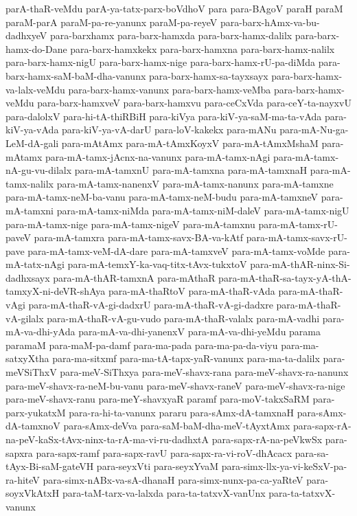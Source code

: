 {parA-thaR-veMdu
parA-ya-tatx-parx-boVdhoV
para
para-BAgoV
paraH
paraM
paraM-parA
paraM-pa-re-yanunx
paraM-pa-reyeV
para-barx-hAmx-va-bu-dadhxyeV
para-barxhamx
para-barx-hamxda
para-barx-hamx-dalilx
para-barx-hamx-do-Dane
para-barx-hamxkekx
para-barx-hamxna
para-barx-hamx-nalilx
para-barx-hamx-nigU
para-barx-hamx-nige
para-barx-hamx-rU-pa-diMda
para-barx-hamx-saM-baM-dha-vanunx
para-barx-hamx-sa-tayxsayx
para-barx-hamx-va-lalx-veMdu
para-barx-hamx-vanunx
para-barx-hamx-veMba
para-barx-hamx-veMdu
para-barx-hamxveV
para-barx-hamxvu
para-ceCxVda
para-ceY-ta-nayxvU
para-dalolxV
para-hi-tA-thiRBiH
para-kiVya
para-kiV-ya-saM-ma-ta-vAda
para-kiV-ya-vAda
para-kiV-ya-vA-darU
para-loV-kakekx
para-mANu
para-mA-Nu-ga-LeM-dA-gali
para-mAtAmx
para-mA-tAmxKoyxV
para-mA-tAmxMshaM
para-mAtamx
para-mA-tamx-jAcnx-na-vanunx
para-mA-tamx-nAgi
para-mA-tamx-nA-gu-vu-dilalx
para-mA-tamxnU
para-mA-tamxna
para-mA-tamxnaH
para-mA-tamx-nalilx
para-mA-tamx-nanenxV
para-mA-tamx-nanunx
para-mA-tamxne
para-mA-tamx-neM-ba-vanu
para-mA-tamx-neM-budu
para-mA-tamxneV
para-mA-tamxni
para-mA-tamx-niMda
para-mA-tamx-niM-daleV
para-mA-tamx-nigU
para-mA-tamx-nige
para-mA-tamx-nigeV
para-mA-tamxnu
para-mA-tamx-rU-paveV
para-mA-tamxra
para-mA-tamx-savx-BA-va-kAtf
para-mA-tamx-savx-rU-pave
para-mA-tamx-veM-dA-dare
para-mA-tamxveV
para-mA-tamx-voMde
para-mA-tatx-nAgi
para-mA-temxY-ka-vaq-titx-tAvx-tukxtoV
para-mA-thAR-ninx-Si-dadhxsayx
para-mA-thAR-tamxnA
para-mAthaR
para-mA-thaR-sa-tayx-yA-thA-tamxyX-ni-deVR-shAya
para-mA-thaRtoV
para-mA-thaR-vAda
para-mA-thaR-vAgi
para-mA-thaR-vA-gi-dadxrU
para-mA-thaR-vA-gi-dadxre
para-mA-thaR-vA-gilalx
para-mA-thaR-vA-gu-vudo
para-mA-thaR-valalx
para-mA-vadhi
para-mA-va-dhi-yAda
para-mA-va-dhi-yanenxV
para-mA-va-dhi-yeMdu
parama
paramaM
para-maM-pa-damf
para-ma-pada
para-ma-pa-da-viyu
para-ma-satxyXtha
para-ma-sitxmf
para-ma-tA-tapx-yaR-vanunx
para-ma-ta-dalilx
para-meVSiThxV
para-meV-SiThxya
para-meV-shavx-rana
para-meV-shavx-ra-nanunx
para-meV-shavx-ra-neM-bu-vanu
para-meV-shavx-raneV
para-meV-shavx-ra-nige
para-meV-shavx-ranu
para-meY-shavxyaR
paramf
para-moV-takxSaRM
para-parx-yukatxM
para-ra-hi-ta-vanunx
pararu
para-sAmx-dA-tamxnaH
para-sAmx-dA-tamxnoV
para-sAmx-deVva
para-saM-baM-dha-meV-tAyxtAmx
para-sapx-rA-na-peV-kaSx-tAvx-ninx-ta-rA-ma-vi-ru-dadhxtA
para-sapx-rA-na-peVkwSx
para-sapxra
para-sapx-ramf
para-sapx-ravU
para-sapx-ra-vi-roV-dhAcacx
para-sa-tAyx-Bi-saM-gateVH
para-seyxVti
para-seyxYvaM
para-simx-llx-ya-vi-keSxV-pa-ra-hiteV
para-simx-nABx-va-sA-dhanaH
para-simx-nunx-pa-ca-yaRteV
para-soyxVkAtxH
para-taM-tarx-va-lalxda
para-ta-tatxvX-vanUnx
para-ta-tatxvX-vanunx
}
